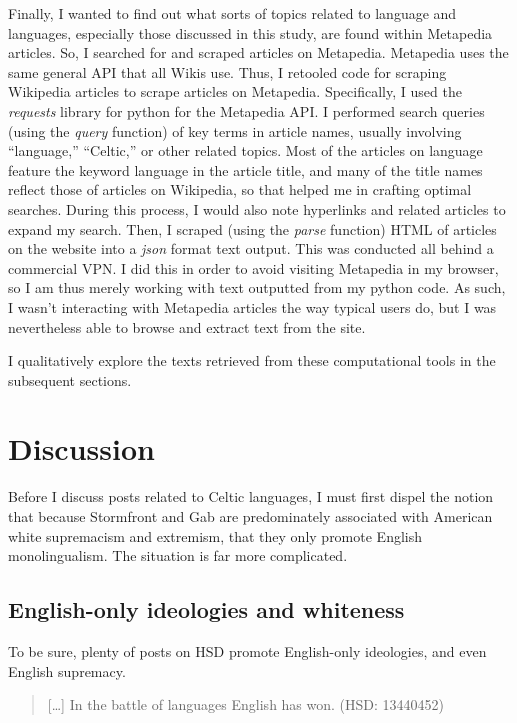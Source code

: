 \documentclass[output=paper,colorlinks,citecolor=brown]{langscibook}
\begin{document}
Finally, I wanted to find out what sorts of topics related to language and languages, especially those discussed in this study, are found within Metapedia articles. So, I searched for and scraped articles on Metapedia. Metapedia uses the same general API that all Wikis use. Thus, I retooled code for scraping Wikipedia articles to scrape articles on Metapedia. Specifically, I used the \emph{requests} library for python for the Metapedia API. I performed search queries (using the \emph{query} function) of key terms in article names, usually involving ``language,'' ``Celtic,'' or other related topics. Most of the articles on language feature the keyword language in the article title, and many of the title names reflect those of articles on Wikipedia, so that helped me in crafting optimal searches. During this process, I would also note hyperlinks and related articles to expand my search. Then, I scraped (using the \emph{parse} function) HTML of articles on the website into a \emph{json} format text output. This was conducted all behind a commercial VPN. I did this in order to avoid visiting Metapedia in my browser, so I am thus merely working with text outputted from my python code. As such, I wasn't interacting with Metapedia articles the way typical users do, but I was nevertheless able to browse and extract text from the site.

I qualitatively explore the texts retrieved from these computational tools in the subsequent sections.


\section{Discussion}\label{sec:powell:3}

Before I discuss posts related to Celtic languages, I must first dispel the notion that because Stormfront and Gab are predominately associated with American white supremacism and extremism, that they only promote English monolingualism. The situation is far more complicated.


\subsection{English-only ideologies and whiteness}

To be sure, plenty of posts on HSD promote English-only ideologies, and even English supremacy.

\begin{quote} 
{[}\ldots{]} In the battle of languages English has won. (HSD: 13440452) 
\end{quote}
\end{document}
